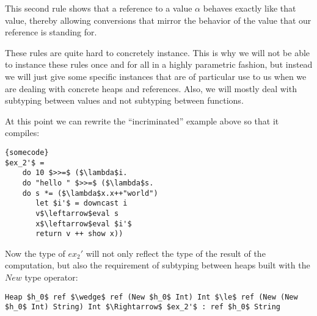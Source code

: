 \documentclass[a4paper]{article}
\begin{document}
This second rule shows that a reference to a value $\alpha $ behaves exactly like that value, thereby allowing conversions that mirror the behavior of the value that our reference is standing for.

These rules are quite hard to concretely instance. This is why we will not be able to instance these rules once and for all in a highly parametric fashion, but instead we will just give some specific instances that are of particular use to us when we are dealing with concrete heaps and references. Also, we will mostly deal with subtyping between values and not subtyping between functions.

At this point we can rewrite the ``incriminated'' example above so that it compiles:

\begin{lstlisting}[frame=tb,mathescape]{somecode}
$ex_2'$ =
	do 10 $>>=$ ($\lambda$i.
	do "hello " $>>=$ ($\lambda$s.
	do s *= ($\lambda$x.x++"world")
	   let $i'$ = downcast i
	   v$\leftarrow$eval s
	   x$\leftarrow$eval $i'$
	   return v ++ show x))
\end{lstlisting}

Now the type of $ex_2'$ will not only reflect the type of the result of the computation, but also the requirement of subtyping between heaps built with the $New$ type operator:

\begin{lstlisting}
Heap $h_0$ ref $\wedge$ ref (New $h_0$ Int) Int $\le$ ref (New (New $h_0$ Int) String) Int $\Rightarrow$ $ex_2'$ : ref $h_0$ String
\end{lstlisting}
\end{document}
